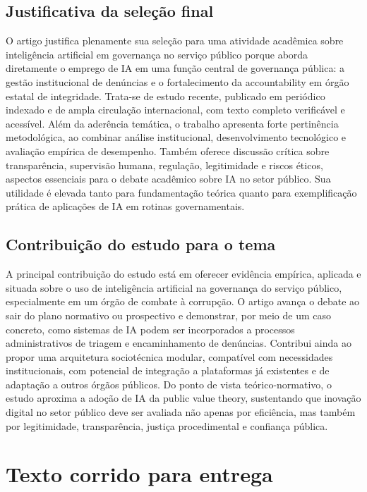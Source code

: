 \documentclass[12pt,a4paper]{article}
\begin{document}
\subsection{Justificativa da seleção final}
\label{sec:org1d5403a}

O artigo justifica plenamente sua seleção para uma atividade acadêmica sobre inteligência artificial em governança no serviço público porque aborda diretamente o emprego de IA em uma função central de governança pública: a gestão institucional de denúncias e o fortalecimento da accountability em órgão estatal de integridade. Trata-se de estudo recente, publicado em periódico indexado e de ampla circulação internacional, com texto completo verificável e acessível. Além da aderência temática, o trabalho apresenta forte pertinência metodológica, ao combinar análise institucional, desenvolvimento tecnológico e avaliação empírica de desempenho. Também oferece discussão crítica sobre transparência, supervisão humana, regulação, legitimidade e riscos éticos, aspectos essenciais para o debate acadêmico sobre IA no setor público. Sua utilidade é elevada tanto para fundamentação teórica quanto para exemplificação prática de aplicações de IA em rotinas governamentais.

\subsection{Contribuição do estudo para o tema}
\label{sec:org0e13ab4}

A principal contribuição do estudo está em oferecer evidência empírica, aplicada e situada sobre o uso de inteligência artificial na governança do serviço público, especialmente em um órgão de combate à corrupção. O artigo avança o debate ao sair do plano normativo ou prospectivo e demonstrar, por meio de um caso concreto, como sistemas de IA podem ser incorporados a processos administrativos de triagem e encaminhamento de denúncias. Contribui ainda ao propor uma arquitetura sociotécnica modular, compatível com necessidades institucionais, com potencial de integração a plataformas já existentes e de adaptação a outros órgãos públicos. Do ponto de vista teórico-normativo, o estudo aproxima a adoção de IA da public value theory, sustentando que inovação digital no setor público deve ser avaliada não apenas por eficiência, mas também por legitimidade, transparência, justiça procedimental e confiança pública.

\section{Texto corrido para entrega}
\label{sec:orge049d13}
\end{document}
